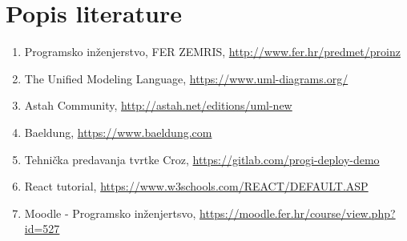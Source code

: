 \chapter*{Popis literature}
	 	
		
		
		\begin{enumerate}
			
			
			\item  Programsko inženjerstvo, FER ZEMRIS, \url{http://www.fer.hr/predmet/proinz}
			
			\item  The Unified Modeling Language, \url{https://www.uml-diagrams.org/}
			
			\item  Astah  Community, \url{http://astah.net/editions/uml-new}
			
			\item  Baeldung, \url{https://www.baeldung.com}
			
			\item  Tehnička predavanja tvrtke Croz, \url{https://gitlab.com/progi-deploy-demo}
			
			\item  React tutorial, \url{ https://www.w3schools.com/REACT/DEFAULT.ASP}

            \item Moodle - Programsko inženjertsvo, \url{https://moodle.fer.hr/course/view.php?id=527}
		\end{enumerate}
		
		 